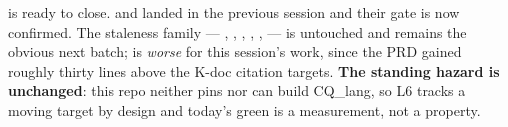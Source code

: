  is ready to close.  and  landed in the previous
session and their gate is now confirmed. The staleness family --- ,
, , , ,  --- is untouched and
remains the obvious next batch;  is \emph{worse} for this session's
work, since the PRD gained roughly thirty lines above the K-doc citation targets.
\textbf{The standing hazard is unchanged}: this repo neither pins nor can build
CQ\_lang, so L6 tracks a moving target by design and today's green is a
measurement, not a property.
